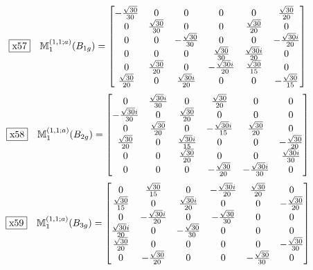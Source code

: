 \documentclass[fleqn,10pt,landscape]{jsarticle}
\begin{document}
\begin{dmath*}
\fbox{x57}\quad \mathbb{M}_{1}^{(1,1;a)}(B_{1g})=\begin{bmatrix} - \frac{\sqrt{30}}{30} & 0 & 0 & 0 & 0 & \frac{\sqrt{30}}{20} \\ 0 & \frac{\sqrt{30}}{30} & 0 & 0 & \frac{\sqrt{30}}{20} & 0 \\ 0 & 0 & - \frac{\sqrt{30}}{30} & 0 & 0 & - \frac{\sqrt{30} i}{20} \\ 0 & 0 & 0 & \frac{\sqrt{30}}{30} & \frac{\sqrt{30} i}{20} & 0 \\ 0 & \frac{\sqrt{30}}{20} & 0 & - \frac{\sqrt{30} i}{20} & \frac{\sqrt{30}}{15} & 0 \\ \frac{\sqrt{30}}{20} & 0 & \frac{\sqrt{30} i}{20} & 0 & 0 & - \frac{\sqrt{30}}{15} \end{bmatrix}
\end{dmath*}
\begin{dmath*}
\fbox{x58}\quad \mathbb{M}_{1}^{(1,1;a)}(B_{2g})=\begin{bmatrix} 0 & \frac{\sqrt{30} i}{30} & 0 & \frac{\sqrt{30}}{20} & 0 & 0 \\ - \frac{\sqrt{30} i}{30} & 0 & \frac{\sqrt{30}}{20} & 0 & 0 & 0 \\ 0 & \frac{\sqrt{30}}{20} & 0 & - \frac{\sqrt{30} i}{15} & \frac{\sqrt{30}}{20} & 0 \\ \frac{\sqrt{30}}{20} & 0 & \frac{\sqrt{30} i}{15} & 0 & 0 & - \frac{\sqrt{30}}{20} \\ 0 & 0 & \frac{\sqrt{30}}{20} & 0 & 0 & \frac{\sqrt{30} i}{30} \\ 0 & 0 & 0 & - \frac{\sqrt{30}}{20} & - \frac{\sqrt{30} i}{30} & 0 \end{bmatrix}
\end{dmath*}
\begin{dmath*}
\fbox{x59}\quad \mathbb{M}_{1}^{(1,1;a)}(B_{3g})=\begin{bmatrix} 0 & \frac{\sqrt{30}}{15} & 0 & - \frac{\sqrt{30} i}{20} & \frac{\sqrt{30}}{20} & 0 \\ \frac{\sqrt{30}}{15} & 0 & \frac{\sqrt{30} i}{20} & 0 & 0 & - \frac{\sqrt{30}}{20} \\ 0 & - \frac{\sqrt{30} i}{20} & 0 & - \frac{\sqrt{30}}{30} & 0 & 0 \\ \frac{\sqrt{30} i}{20} & 0 & - \frac{\sqrt{30}}{30} & 0 & 0 & 0 \\ \frac{\sqrt{30}}{20} & 0 & 0 & 0 & 0 & - \frac{\sqrt{30}}{30} \\ 0 & - \frac{\sqrt{30}}{20} & 0 & 0 & - \frac{\sqrt{30}}{30} & 0 \end{bmatrix}
\end{dmath*}
\end{document}
